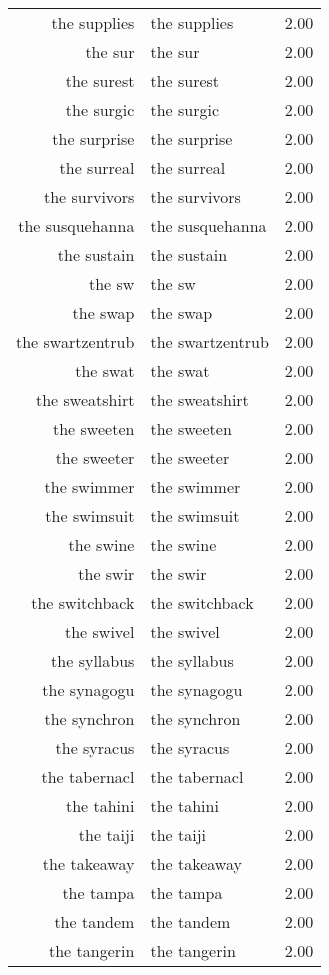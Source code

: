 \begin{table}[ht]
\begin{tabular}{rlr}
  the supplies & the supplies & 2.00 \\ 
  the sur & the sur & 2.00 \\ 
  the surest & the surest & 2.00 \\ 
  the surgic & the surgic & 2.00 \\ 
  the surprise & the surprise & 2.00 \\ 
  the surreal & the surreal & 2.00 \\ 
  the survivors & the survivors & 2.00 \\ 
  the susquehanna & the susquehanna & 2.00 \\ 
  the sustain & the sustain & 2.00 \\ 
  the sw & the sw & 2.00 \\ 
  the swap & the swap & 2.00 \\ 
  the swartzentrub & the swartzentrub & 2.00 \\ 
  the swat & the swat & 2.00 \\ 
  the sweatshirt & the sweatshirt & 2.00 \\ 
  the sweeten & the sweeten & 2.00 \\ 
  the sweeter & the sweeter & 2.00 \\ 
  the swimmer & the swimmer & 2.00 \\ 
  the swimsuit & the swimsuit & 2.00 \\ 
  the swine & the swine & 2.00 \\ 
  the swir & the swir & 2.00 \\ 
  the switchback & the switchback & 2.00 \\ 
  the swivel & the swivel & 2.00 \\ 
  the syllabus & the syllabus & 2.00 \\ 
  the synagogu & the synagogu & 2.00 \\ 
  the synchron & the synchron & 2.00 \\ 
  the syracus & the syracus & 2.00 \\ 
  the tabernacl & the tabernacl & 2.00 \\ 
  the tahini & the tahini & 2.00 \\ 
  the taiji & the taiji & 2.00 \\ 
  the takeaway & the takeaway & 2.00 \\ 
  the tampa & the tampa & 2.00 \\ 
  the tandem & the tandem & 2.00 \\ 
  the tangerin & the tangerin & 2.00 \\ 

\end{tabular}
\end{table}

